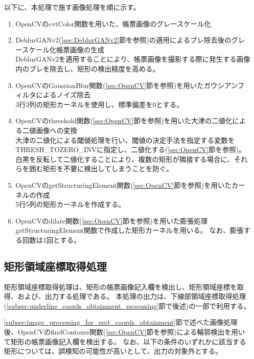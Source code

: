 以下に、本処理で施す画像処理を順に示す。

\begin{enumerate}
    \item OpenCVのcvtColor関数を用いた、帳票画像のグレースケール化
    \item DeblurGANv2(\ref{sec:DeblurGANv2}節を参照)の適用によるブレ除去後のグレースケール化帳票画像の生成\\
        DeblurGANv2を適用することにより、帳票画像を撮影する際に発生する画像内のブレを除去し、矩形の検出精度を高める。
    \item OpenCVのGaussianBlur関数(\ref{sec:OpenCV}節を参照)を用いたガウシアンフィルタによるノイズ除去\\
        3行3列の矩形カーネルを使用し、標準偏差を0とする。
    \item OpenCVのthreshold関数(\ref{sec:OpenCV}節を参照)を用いた大津の二値化による二値画像への変換\\
        大津の二値化による閾値処理を行い、閾値の決定手法を指定する変数をTHRESH\_TOZERO\_INVに指定し、二値化する(\ref{sec:OpenCV}節を参照)。
        白黒を反転して二値化することにより、複数の矩形が隣接する場合に、それらを囲む矩形を不要に検出してしまうことを防ぐ。
    \item OpenCVのgetStructuringElement関数(\ref{sec:OpenCV}節を参照)を用いたカーネルの作成\\
        5行5列の矩形カーネルを作成する。
    \item OpenCVのdilate関数(\ref{sec:OpenCV}節を参照)を用いた膨張処理\\
        getStructuringElement関数で作成した矩形カーネルを用いる。
        なお、膨張する回数は1回とする。
\end{enumerate}


\subsection{矩形領域座標取得処理}\label{subsec:rect_coords_obtainment_processing}
矩形領域座標取得処理は、矩形の帳票画像記入欄を検出し、矩形領域座標を取得、および、出力する処理である。
本処理の出力は、下線部領域座標取得処理(\ref{subsec:underline_coords_obtainment_processing}節で後述)の一部で利用する。

\ref{subsec:image_processing_for_rect_coords_obtainment}節で述べた画像処理後、OpenCVのfindContours関数(\ref{sec:OpenCV}節を参照)による輪郭検出を用いて矩形の帳票画像記入欄を検出する。
なお、以下の条件のいずれかに該当する矩形については、誤検知の可能性が高いとして、出力の対象外とする。


